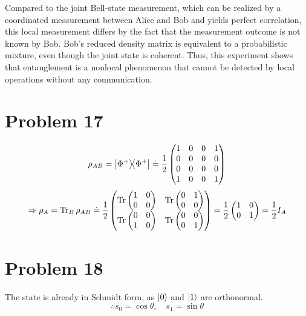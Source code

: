 \documentclass[11pt]{article}
\begin{document}
Compared to the joint Bell-state measurement,
which can be realized by a coordinated measurement between Alice and Bob
and yields perfect correlation,
this local measurement differs by the fact that the measurement outcome is not known by Bob.
Bob's reduced density matrix is equivalent to a probabilistic mixture,
even though the joint state is coherent.
Thus, this experiment shows that entanglement is a nonlocal phenomenon
that cannot be detected by local operations without any communication.

\section*{Problem 17}
\[
    \rho_{AB} = \ketbra{\Phi^+}{\Phi^+}
    \doteq \frac{1}{2} \begin{pmatrix}
        1 & 0 & 0 & 1 \\ 0 & 0 & 0 & 0 \\ 0 & 0 & 0 & 0 \\ 1 & 0 & 0 & 1
    \end{pmatrix}
\]
\[
    \Rightarrow \rho_A = \operatorname{Tr}_B \rho_{AB}
    \doteq \frac{1}{2} \begin{pmatrix}
        \operatorname{Tr}\begin{pmatrix} 1 & 0 \\ 0 & 0 \end{pmatrix} &
        \operatorname{Tr}\begin{pmatrix} 0 & 1 \\ 0 & 0 \end{pmatrix} \\
        \operatorname{Tr}\begin{pmatrix} 0 & 0 \\ 1 & 0 \end{pmatrix} &
        \operatorname{Tr}\begin{pmatrix} 0 & 0 \\ 0 & 1 \end{pmatrix}
    \end{pmatrix}
    = \frac{1}{2} \begin{pmatrix} 1 & 0 \\ 0 & 1 \end{pmatrix}
    = \frac{1}{2} I_A
\]

\section*{Problem 18}
The state is already in Schmidt form, as $\ket{0}$ and $\ket{1}$ are orthonormal.
\[
    \therefore s_0 = \cos\theta,\quad s_1 = \sin\theta
\]
\end{document}

